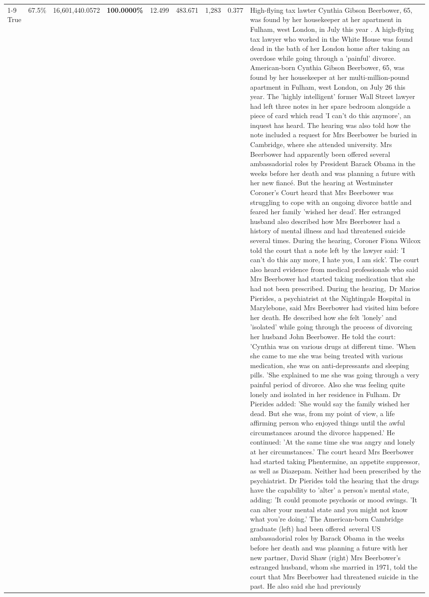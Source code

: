 \begin{table}[H]
\begin{tabular}{lllrlllll}
\cline{1-9}
True & 67.5\% & 16,601,440.0572 & \bfseries \color{red} 100.0000\% & 12.499 & 483.671 & 1,283 & 0.377 & High-flying tax lawter Cynthia Gibson Beerbower, 65, was found by her housekeeper at her apartment in Fulham, west London, in July this year . A high-flying tax lawyer who worked in the White House was found dead in the bath of her London home after taking an overdose while going through a 'painful' divorce. American-born Cynthia Gibson Beerbower, 65, was found by her housekeeper at her multi-million-pound apartment in Fulham, west London, on July 26 this year. The 'highly intelligent' former Wall Street lawyer had left three notes in her spare bedroom alongside a piece of card which read 'I can't do this anymore', an inquest has heard. The hearing was also told how the note included a request for Mrs Beerbower be buried in Cambridge, where she attended university. Mrs Beerbower had apparently been offered several ambassadorial roles by President Barack Obama in the weeks before her death and was planning a future with her new fiancé. But the hearing at Westminster Coroner's Court heard that Mrs Beerbower was struggling to cope with an ongoing divorce battle and feared her family 'wished her dead'. Her estranged husband also described how Mrs Beerbower had a history of mental illness and had threatened suicide several times. During the hearing, Coroner Fiona Wilcox told the court that a note left by the lawyer said: 'I can't do this any more, I hate you, I am sick'. The court also heard evidence from medical professionals who said Mrs Beerbower had started taking medication that she had not been prescribed. During the hearing, Dr Marios Pierides, a psychiatrist at the Nightingale Hospital in Marylebone, said Mrs Beerbower had visited him before her death. He described how she felt 'lonely' and 'isolated' while going through the process of divorcing her husband John Beerbower. He told the court: 'Cynthia was on various drugs at different time. 'When she came to me she was being treated with various medication, she was on anti-depressants and sleeping pills. 'She explained to me she was going through a very painful period of divorce. Also she was feeling quite lonely and isolated in her residence in Fulham. Dr Pierides added: 'She would say the family wished her dead. But she was, from my point of view, a life affirming person who enjoyed things until the awful circumstances around the divorce happened.' He continued: 'At the same time she was angry and lonely at her circumstances.' The court heard Mrs Beerbower had started taking Phentermine, an appetite suppressor, as well as Diazepam. Neither had been prescribed by the psychiatrist. Dr Pierides told the hearing that the drugs have the capability to 'alter' a person's mental state, adding: 'It could promote psychosis or mood swings. 'It can alter your mental state and you might not know what you're doing.' The American-born Cambridge graduate (left) had been offered several US ambassadorial roles by Barack Obama in the weeks before her death and was planning a future with her new partner, David Shaw (right) Mrs Beerbower's estranged husband, whom she married in 1971, told the court that Mrs Beerbower had threatened suicide in the past. He also said she had previously 
\end{tabular}
\end{table}
